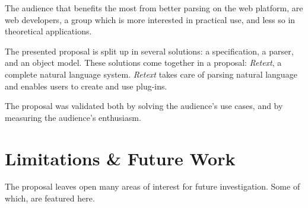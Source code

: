 The audience that benefits the most from better parsing on the web platform,
  are web developers, a group which is more interested in practical use, and
  less so in theoretical applications.

The presented proposal is split up in several solutions: a specification, a
  parser, and an object model.
These solutions come together in a proposal: \emph{Retext}, a complete natural
  language system.
\emph{Retext} takes care of parsing natural language and enables users to
  create and use plug-ins.

The proposal was validated both by solving the audience's use cases, and
  by measuring the audience's enthusiasm.

\section{Limitations \& Future Work}\label{limitations-future-work}

The proposal leaves open many areas of interest for future investigation.
Some of which, are featured here.

